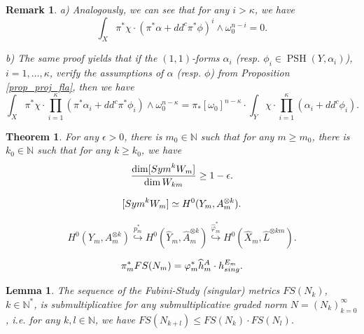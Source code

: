\documentclass[10pt,a4paper]{amsart}
\newtheorem{thm}{Theorem}
\newtheorem{rem}{Remark}
\newtheorem{lem}{Lemma}
\newcommand{\nat}{\mathbb{N}}
\newcommand{\psh}{\operatorname{PSH}}
\newcommand{\sym}{{\rm{Sym}}}
\begin{document}
	\begin{rem}\label{rem_zero_prod}
		a)
		Analogously, we can see that for any $i > \kappa$, we have
		\begin{equation}
			\int_X \pi^* \chi \cdot (\pi^* \alpha + dd^c \pi^* \phi)^{i} \wedge \omega_0^{n - i}
			=
			0.
		\end{equation}
		\par 
		b) The same proof yields that if the $(1, 1)$-forms $\alpha_i$ (resp. $\phi_i \in \psh(Y, \alpha_i)$), $i = 1, \ldots, \kappa$, verify the assumptions of $\alpha$ (resp. $\phi$) from Proposition \ref{prop_proj_fla}, then we have
		\begin{equation}
			\int_X \pi^* \chi \cdot \prod_{i = 1}^{\kappa} (\pi^* \alpha_i + dd^c \pi^* \phi_i) \wedge \omega_0^{n - \kappa}
			=
			\pi_*[\omega_0]^{n - \kappa}
			\cdot
			\int_Y \chi \cdot  \prod_{i = 1}^{\kappa} (\alpha_i + dd^c \phi_i).
		\end{equation}
	\end{rem}

	\begin{thm}\label{thm_sym_subalgebra}
		For any $\epsilon > 0$, there is $m_0 \in \nat$ such that for any $m \geq m_0$, there is $k_0 \in \nat$ such that for any $k \geq k_0$, we have
		\begin{equation}
			\frac{\dim [\sym^k W_m]}{\dim W_{km}}
			\geq 
			1 - \epsilon.
		\end{equation}
	\end{thm}

	\begin{equation}\label{eq_sym_yk_rel}
		[\sym^k W_m]
		\simeq
		H^0(Y_m, A_m^{\otimes k}).
	\end{equation}

	\begin{equation}\label{eq_incl_resol_coh}
		H^0(Y_m, A_m^{\otimes k}) 
		\overset{p_m^*}{\hookrightarrow} 
		H^0(\widehat{Y}_m, \widehat{A}_m^{\otimes k}) 
		\overset{\widehat{\varphi}_m^*}{\hookrightarrow} 
		H^0(\widehat{X}_m, \widehat{L}^{\otimes k m}).
	\end{equation}

	\begin{equation}\label{eq_fs_n_k_a_k_rel}
		\pi_m^* FS(N_m)
		=
		\varphi_m^*
		\widehat{h}^A_m
		\cdot
		h^{E_m}_{{\rm{sing}}}.
	\end{equation}

	\begin{lem}\label{lem_fs_sm}
		The sequence of the Fubini-Study (singular) metrics $FS(N_k)$, $k \in \nat^*$, is submultiplicative for any submultiplicative graded norm $N = (N_k)_{k = 0}^{\infty}$, i.e. for any $k, l \in \nat$, we have $FS(N_{k + l}) \leq FS(N_k) \cdot FS(N_l)$.
	\end{lem}
\end{document}
